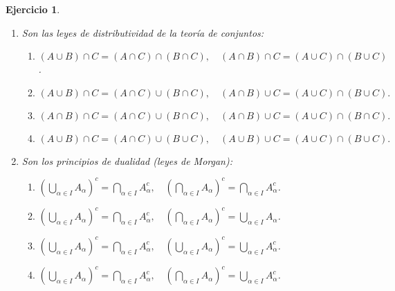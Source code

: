 \documentclass[twoside,12pt,a4 paper,openright]{book}
\newtheorem{ejer}[claim]{Ejercicio}
\begin{document}
\begin{ejer} \ {}

\newpage

\begin{enumerate}


\item Son las leyes de distributividad de la teor\'ia de conjuntos: 
{\small
\begin{enumerate}
\item[\textcolor{red}{$\bullet$}] {} $ (A\cup B)\cap C   =(A\cap C)\cap (B\cap C) , \quad (A\cap B)\cap C   =(A\cup C)\cap (B\cup C) $. 
\item[\textcolor{blue}{$\bullet$}]  {} $ (A\cup B)\cap C   =(A\cap C)\cup (B\cap C) , \quad (A\cap B)\cup C   =(A\cup C)\cap (B\cup C) .$ 
\item[\textcolor{yellow}{$\bullet$}] {} $(A\cap B)\cap C   =(A\cap C)\cup (B\cap C) , \quad (A\cap B)\cup C   =(A\cup C)\cap (B\cap C) .$ 
\item[\textcolor{green}{$\bullet$}] {} $(A\cup B)\cap C   =(A\cap C)\cup (B\cup C) , \quad (A\cup B)\cup C   =(A\cup C)\cap (B\cup C) .$
\end{enumerate}
}


\newpage

\item Son los principios de dualidad (leyes de Morgan):
{\small
\begin{enumerate}
\item[\textcolor{red}{$\bullet$}] {} $\left(\bigcup_{\alpha \in I}A_{\alpha}\right)^{c} =\bigcap_{\alpha \in I}A_{\alpha}^{c}, \quad \left(\bigcap_{\alpha \in I} A_{\alpha}\right)^{c} = \bigcap_{\alpha \in I} A_{\alpha}^{c} $. 
\item[\textcolor{blue}{$\bullet$}] {} $\left(\bigcup_{\alpha \in I}A_{\alpha}\right)^{c} =\bigcap_{\alpha \in I}A_{\alpha}^{c}, \quad \left(\bigcap_{\alpha \in I} A_{\alpha}\right)^{c} = \bigcup_{\alpha \in I} A_{\alpha}  $. 
\item[\textcolor{yellow}{$\bullet$}] {} $\left(\bigcup_{\alpha \in I}A_{\alpha}\right)^{c} =\bigcap_{\alpha \in I}A_{\alpha}^{c}, \quad \left(\bigcup_{\alpha \in I} A_{\alpha}\right)^{c} = \bigcup_{\alpha \in I} A_{\alpha}^{c} $. 
\item[\textcolor{green}{$\bullet$}] {} $\left(\bigcup_{\alpha \in I}A_{\alpha}\right)^{c} =\bigcap_{\alpha \in I}A_{\alpha}^{c}, \quad \left(\bigcap_{\alpha \in I} A_{\alpha}\right)^{c} = \bigcup_{\alpha \in I} A_{\alpha}^{c} $. 
\end{enumerate}
}



\end{enumerate}
\end{ejer}
\end{document}
